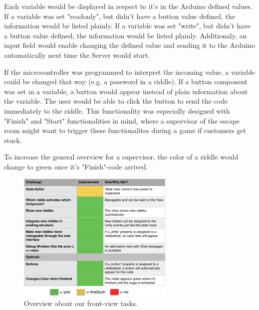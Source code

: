 Each variable would be displayed in respect to it's in the Arduino defined values. 
If a variable was set "readonly", but didn't have a button value defined, the information would be listed plainly.
If a variable was set "write", but didn't have a button value defined, the information would be listed plainly. 
Additionaly, an input field would enable changing the defined value and sending it to the Arduino automatically next time the Server would start. 

If the microcontroller was programmed to interpret the incoming value, a variable could be changed that way (e.g. a password in a riddle).
If a button component was set in a variable, a button would appear instead of plain information about the variable. 
The user would be able to click the button to send the code immediately to the riddle. 
This functionality was especially designed with "Finish" and "Start" functionalities in mind, where a supervisor of the escape room might want to trigger these functionalites during a game if customers get stuck.

To increase the general overview for a supervisor, the color of a riddle would change to green once it's "Finish"-code arrived.

\begin{figure}[th]
	\centering
	\includegraphics[width=75mm,scale=0.75]{Figures/frontendOverview}
	\decoRule
	\caption[FrontViewTable]{Overview about our front-view tasks.}
	\label{fig:FrontViewTable}
\end{figure}



